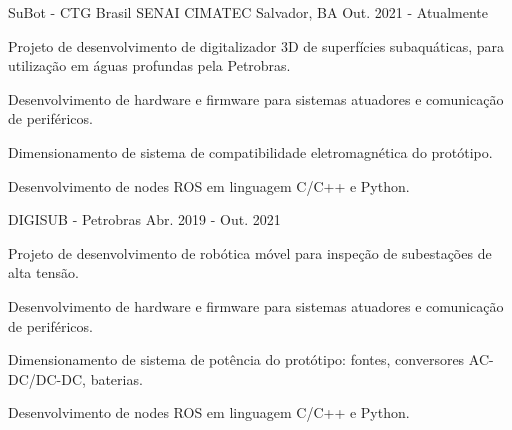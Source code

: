 

\begin{cventries}

  \cventry
    {SuBot - CTG Brasil} %
    {SENAI CIMATEC} %
    {Salvador, BA} %
    {Out. 2021 - Atualmente} %
    {
      \begin{cvitems} %
        \item {Projeto de desenvolvimento de digitalizador 3D de superfícies subaquáticas, para utilização em águas profundas pela Petrobras.}
        \item {Desenvolvimento de hardware e firmware para sistemas atuadores e comunicação de periféricos.}
        \item {Dimensionamento de sistema de compatibilidade eletromagnética do protótipo.}
        \item {Desenvolvimento de nodes ROS em linguagem C/C++ e Python.}
      \end{cvitems}
    }


  \cventry
    {DIGISUB - Petrobras} %
    {} %
    {} %
    {Abr. 2019 - Out. 2021} %
    {
      \begin{cvitems} %
        \item {Projeto de desenvolvimento de robótica móvel para inspeção de subestações de alta tensão.}
        \item {Desenvolvimento de hardware e firmware para sistemas atuadores e comunicação de periféricos.}
        \item {Dimensionamento de sistema de potência do protótipo: fontes, conversores AC-DC/DC-DC, baterias.}
        \item {Desenvolvimento de nodes ROS em linguagem C/C++ e Python.}
      \end{cvitems}
    }



\end{cventries}
